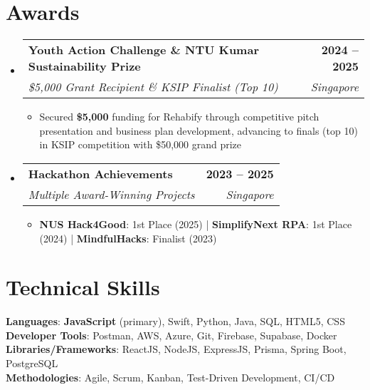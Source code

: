 \documentclass[letterpaper,11pt]{article}
\makeatletter
\newcommand{\resumeItem}[1]{
  \item\small{#1}
}
\newcommand{\resumeSubheading}[4]{
  \vspace{-2pt}\item
    \begin{tabular*}{1.0\textwidth}[t]{l@{\extracolsep{\fill}}r}
      \textbf{#1} & \textbf{\small #2} \\
      \textit{\small#3} & \textit{\small #4} \\
    \end{tabular*}\vspace{-7pt}
}
\newcommand{\resumeSubHeadingListStart}{\begin{itemize}[leftmargin=0.0in, label={}]}
\newcommand{\resumeSubHeadingListEnd}{\end{itemize}}
\newcommand{\resumeItemListStart}{\begin{itemize}}
\newcommand{\resumeItemListEnd}{\end{itemize}\vspace{-5pt}}
\makeatother
\begin{document}
\section{Awards}
    \resumeSubHeadingListStart
        \resumeSubheading
            {Youth Action Challenge \& NTU Kumar Sustainability Prize}{2024 -- 2025}
            {\$5,000 Grant Recipient \& KSIP Finalist (Top 10)}{Singapore}
            \resumeItemListStart
                \resumeItem{Secured \textbf{\$5,000} funding for Rehabify through competitive pitch presentation and business plan development, advancing to finals (top 10) in KSIP competition with \$50,000 grand prize}
            \resumeItemListEnd
            
        \resumeSubheading
            {Hackathon Achievements}{2023 -- 2025}
            {Multiple Award-Winning Projects}{Singapore}
            \resumeItemListStart
                \resumeItem{\textbf{NUS Hack4Good}: 1st Place (2025) | \textbf{SimplifyNext RPA}: 1st Place (2024) | \textbf{MindfulHacks}: Finalist (2023)}
            \resumeItemListEnd
    \resumeSubHeadingListEnd
\vspace{-16pt}

\section{Technical Skills}
 \begin{itemize}[leftmargin=0.15in, label={}]
    \small{\item{   
     \textbf{Languages}{: \textbf{JavaScript} (primary), Swift, Python, Java, SQL, HTML5, CSS} \\[1mm]
     \textbf{Developer Tools}{: Postman, AWS, Azure, Git, Firebase, Supabase, Docker} \\[1mm]
     \textbf{Libraries/Frameworks}{: ReactJS, NodeJS, ExpressJS, Prisma, Spring Boot, PostgreSQL} \\ [1mm]
     \textbf{Methodologies}{: Agile, Scrum, Kanban, Test-Driven Development, CI/CD} \\ [1mm]
    }}
 \end{itemize}
\vspace{-16pt}

\end{document}
